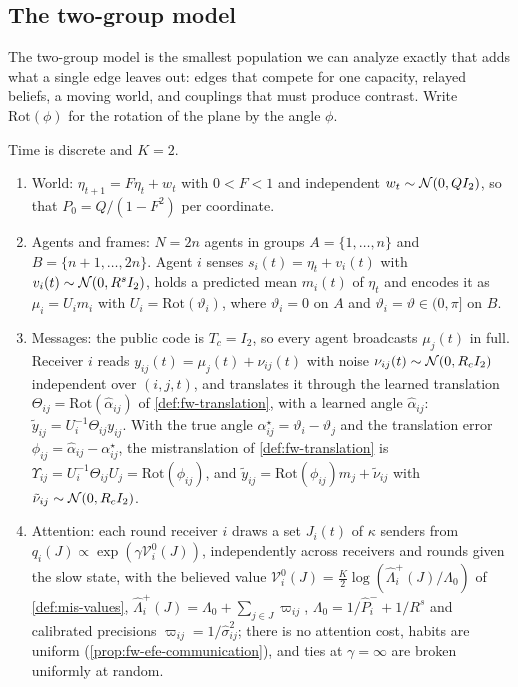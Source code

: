 \subsection{The two-group model}\label{sec:frm-model}

The two-group model is the smallest population we can analyze exactly that adds what a single edge leaves out: edges that compete for one capacity, relayed beliefs, a moving world, and couplings that must produce contrast. Write $\mathrm{Rot}(\phi)$ for the rotation of the plane by the angle $\phi$.

\begin{definition}\label{def:frm-two-group}
Time is discrete and $K=2$.
\begin{enumerate}
\item[(i)] World: $\eta_{t+1}=F\eta_t+w_t$ with $0<F<1$ and independent $w_t\sim\mathcal{N}(0,QI_2)$, so that $P_0=Q/(1-F^2)$ per coordinate.
\item[(ii)] Agents and frames: $N=2n$ agents in groups $A=\{1,\dots,n\}$ and $B=\{n+1,\dots,2n\}$. Agent $i$ senses $s_i(t)=\eta_t+v_i(t)$ with $v_i(t)\sim\mathcal{N}(0,R^sI_2)$, holds a predicted mean $m_i(t)$ of $\eta_t$ and encodes it as $\mu_i=U_im_i$ with $U_i=\mathrm{Rot}(\vartheta_i)$, where $\vartheta_i=0$ on $A$ and $\vartheta_i=\vartheta\in(0,\pi]$ on $B$.
\item[(iii)] Messages: the public code is $T_c=I_2$, so every agent broadcasts $\mu_j(t)$ in full. Receiver $i$ reads $y_{ij}(t)=\mu_j(t)+\nu_{ij}(t)$ with noise $\nu_{ij}(t)\sim\mathcal{N}(0,R_cI_2)$ independent over $(i,j,t)$, and translates it through the learned translation $\Theta_{ij}=\mathrm{Rot}(\hat\alpha_{ij})$ of \cref{def:fw-translation}, with a learned angle $\hat\alpha_{ij}$: $\tilde y_{ij}=U_i^{-1}\Theta_{ij}y_{ij}$. With the true angle $\alpha^\star_{ij}=\vartheta_i-\vartheta_j$ and the translation error $\phi_{ij}=\hat\alpha_{ij}-\alpha^\star_{ij}$, the mistranslation of \cref{def:fw-translation} is $\Upsilon_{ij}=U_i^{-1}\Theta_{ij}U_j=\mathrm{Rot}(\phi_{ij})$, and $\tilde y_{ij}=\mathrm{Rot}(\phi_{ij})m_j+\tilde\nu_{ij}$ with $\tilde\nu_{ij}\sim\mathcal{N}(0,R_cI_2)$.
\item[(iv)] Attention: each round receiver $i$ draws a set $J_i(t)$ of $\kappa$ senders from $q_i(J)\propto\exp(\gamma\mathcal V^0_i(J))$, independently across receivers and rounds given the slow state, with the believed value $\mathcal V^0_i(J)=\frac K2\log(\hat\Lambda^+_i(J)/\Lambda_0)$ of \cref{def:mis-values}, $\hat\Lambda^+_i(J)=\Lambda_0+\sum_{j\in J}\varpi_{ij}$, $\Lambda_0=1/\hat P^-_i+1/R^s$ and calibrated precisions $\varpi_{ij}=1/\hat\sigma^2_{ij}$; there is no attention cost, habits are uniform (\cref{prop:fw-efe-communication}), and ties at $\gamma=\infty$ are broken uniformly at random.

\end{enumerate}
\end{definition}
